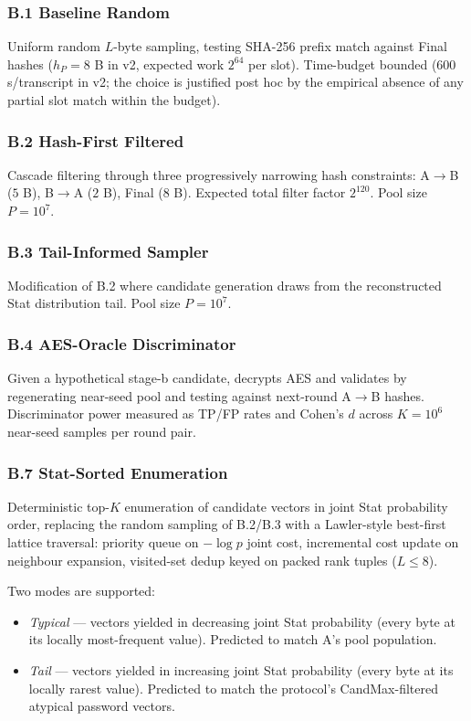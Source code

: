 \documentclass[11pt,a4paper]{article}
\begin{document}
\subsubsection{B.1 Baseline Random}\label{sec:adv-b1}
Uniform random $L$-byte sampling, testing SHA-256 prefix match against Final hashes ($h_P = 8$ B in v2, expected work $2^{64}$ per slot). Time-budget bounded ($600$ s/transcript in v2; the choice is justified post hoc by the empirical absence of any partial slot match within the budget).

\subsubsection{B.2 Hash-First Filtered}\label{sec:adv-b2}
Cascade filtering through three progressively narrowing hash constraints: A$\to$B ($5$ B), B$\to$A ($2$ B), Final ($8$ B). Expected total filter factor $2^{120}$. Pool size $P = 10^7$.

\subsubsection{B.3 Tail-Informed Sampler}\label{sec:adv-b3}
Modification of B.2 where candidate generation draws from the reconstructed Stat distribution tail. Pool size $P = 10^7$.

\subsubsection{B.4 AES-Oracle Discriminator}\label{sec:adv-b4}
Given a hypothetical stage-b candidate, decrypts AES and validates by regenerating near-seed pool and testing against next-round A$\to$B hashes. Discriminator power measured as TP/FP rates and Cohen's $d$ across $K = 10^6$ near-seed samples per round pair.

\subsubsection{B.7 Stat-Sorted Enumeration}\label{sec:adv-b7}
Deterministic top-$K$ enumeration of candidate vectors in joint Stat probability order, replacing the random sampling of B.2/B.3 with a Lawler-style best-first lattice traversal: priority queue on $-\log p$ joint cost, incremental cost update on neighbour expansion, visited-set dedup keyed on packed rank tuples ($L \le 8$).

Two modes are supported:
\begin{itemize}[leftmargin=*]
\item \emph{Typical} — vectors yielded in decreasing joint Stat probability (every byte at its locally most-frequent value). Predicted to match A's pool population.
\item \emph{Tail} — vectors yielded in increasing joint Stat probability (every byte at its locally rarest value). Predicted to match the protocol's CandMax-filtered atypical password vectors.
\end{itemize}
\end{document}
